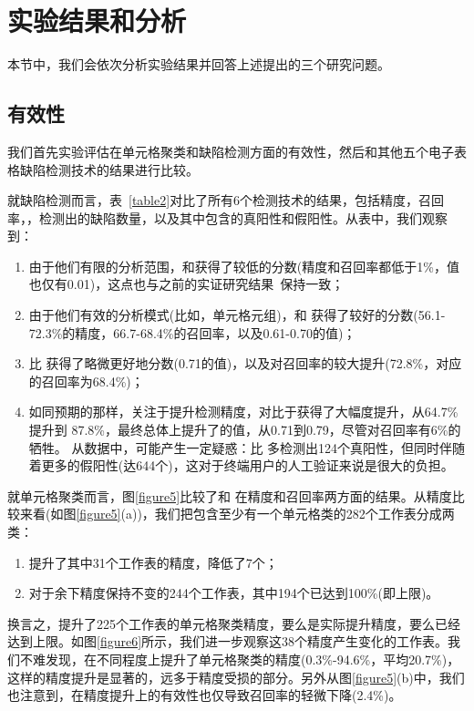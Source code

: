 \section{实验结果和分析}

本节中，我们会依次分析实验结果并回答上述提出的三个研究问题。

\subsection{有效性}

我们首先实验评估\wa 在单元格聚类和缺陷检测方面的有效性，然后和其他五个电子表格缺陷检测技术的结果进行比较。



就缺陷检测而言，表~\ref{table2}对比了所有6个检测技术的结果，包括精度，召回率，\fmd，检测出的缺陷数量，以及其中包含的真阳性和假阳性。从表中，我们观察到：

\begin{enumerate}
    \item 由于他们有限的分析范围，\uc 和\di 获得了较低的分数(精度和召回率都低于1\%，\fmd 值也仅有0.01)，这点也与之前的实证研究结果~\cite{zhang2017effectively}保持一致；
    \item 由于他们有效的分析模式(比如，单元格元组)，\am 和 \ca 获得了较好的分数(56.1-72.3\%的精度，66.7-68.4\%的召回率，以及0.61-0.70的\fmd 值)；
    \item \cu 比 \ca 获得了略微更好地分数(0.71的\fmd 值)，以及对召回率的较大提升(72.8\%，对应的\ca 召回率为68.4\%)；
    \item 如同预期的那样，\wa 关注于提升检测精度，对比于\cu 获得了大幅度提升，从64.7\% 提升到 87.8\%，最终总体上提升了\fmd 的值，从0.71到0.79，尽管对召回率有6\%的牺牲。 从数据中，可能产生一定疑惑：\cu 比 \wa 多检测出124个真阳性，但同时伴随着更多的假阳性(达644个)，这对于终端用户的人工验证来说是很大的负担。
\end{enumerate}



就单元格聚类而言，图\ref{figure5}比较了\cu 和 \wa 在精度和召回率两方面的结果。从精度比较来看(如图\ref{figure5}(a))，我们把包含至少有一个单元格类的282个工作表分成两类：
\begin{enumerate}
    \item \wa 提升了其中31个工作表的精度，降低了7个；
    \item 对于余下精度保持不变的244个工作表，其中194个已达到100\%(即上限)。
\end{enumerate}
换言之，\wa 提升了225个工作表的单元格聚类精度，要么是实际提升精度，要么已经达到上限。如图\ref{figure6}所示，我们进一步观察这38个精度产生变化的工作表。我们不难发现，\wa 在不同程度上提升了单元格聚类的精度(0.3\%-94.6\%，平均20.7\%)，这样的精度提升是显著的，远多于精度受损的部分。另外从图\ref{figure5}(b)中，我们也注意到，\wa 在精度提升上的有效性也仅导致召回率的轻微下降(2.4\%)。

